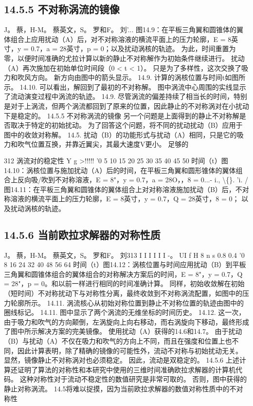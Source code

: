 \documentclass[UTF8,11pt,a4paper,openany,fontset=fandol]{ctexbook}
\begin{document}
\subsection{14.5.5 不对称涡流的镜像}
J。 蔡，H-M。 蔡英文，S。 罗和F。 刘'... 图14.9：在平板三角翼和圆锥体的翼体组合上应用扰动（A）后，对不对称溶液的横流平面上的压力轮廓，E = 8英寸，y = 0.7，a = 28英寸，p = 0；以及扰动涡核的轨迹。 为此，时间重置为零，以便时间准确的尤拉计算以新的静止不对称解作为初始条件继续进行。 扰动（A）再次施加在初始单位时间段（0 < t < 1）。 只是为了多样性，这次交换了吸力和吹风方向。 新方向由图中的箭头显示。 14.9. 计算的涡核位置与时间t如图所示。 14.10. 可以看出，解回到了最初的不对称解。 图中涡流中心周围的实线显示了流动演变过程中涡流的轨迹。 14.9. 尽管涡流的偏差持续了相当长的时间，特别是对于上涡流，但两个涡流都回到了原来的位置，因此静止的不对称涡对在小扰动下是稳定的。 14.5.5 不对称涡流的镜像 另一个问题是上面得到的静止不对称解是否取决于特定的初始扰动。 为了回答这个问题，将不同的扰动扰动（B）应用于图中的收敛对称解。 14.5. 扰动（B）的功能形式与扰动（A）相同，只是它的吸力和吹气位置互换，并靠近翼尖，其最大速度V更小。 足够的

312 涡流对的稳定性 Y g >!!!!! '0 5 10 15 20 25 30 35 40 45 50 时间（t）图14.10：涡核位置与施加扰动（A）后的时间，在平板三角翼和圆形锥体的翼体组合上反向吸/吹到不对称溶液，E = 8"，y = 0.7，a = 28O，，8 = 0...- i., \textbackslash\{\}. 'i. /图14.11：在平板三角翼和圆锥体的翼体组合上对对称溶液施加扰动（B）后，不对称溶液的横流平面上的压力轮廓，E = 8英寸，y = 0.7，Q = 28英寸，8 = 0； 以及扰动涡核的轨迹。

\subsection{14.5.6 当前欧拉求解器的对称性质}
J。 蔡，H-M。 蔡英文，S。 罗和F。 刘313 I I I I I I -。 UI f H 8 n s 0.8 0.4 '0 8 16 24 32 40 48 56 64 时间（t）图14.12：涡核位置与时间应用扰动（B）到平板三角翼和圆锥体组合的翼体组合的对称解决方案后的时间，E = 8"，y = 0.7，Q = 28"，p = 0。和以前一样进行相同的时间准确计算。 同样，初始收敛解在初始（短时间）不对称扰动下与对称性分离，最终收敛到不对称涡流配置，如图中的压力轮廓所示。 14.11. 涡流核心从初始对称位置到静止不对称位置的轨迹由图中的圈线标记。 14.11. 图中显示了两个涡流的无维坐标的时间历史。 14.12. 这一次，由于吸力和吹气的方向颠倒，左涡旋向上向右移动，而右涡旋向下移动，最终形成了图中所示解决方案的完美镜像。 使用扰动（A）获得的14.6和14.7。 由于扰动（B）与扰动（A）不仅在吸力和吹气的方向上不同，而且在强度和位置上也不同，因此计算表明，除了精确的镜像的可能性外，流动不对称与初始扰动无关。 显然，镜像静止不对称涡对也必须稳定。 因此，流动是双稳定的。 14.5.6 上述计算还证明了算法的对称性和本研究中使用的三维时间准确欧拉求解器的计算机代码。 这种对称性对于流动不稳定性的数值研究是非常可取的。 否则，图中获得的静止对称涡流。 14.5将难以捉摸，因为当前欧拉求解器的数值对称性质中的不对称性
\end{document}
